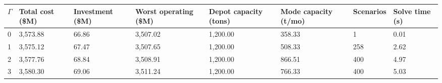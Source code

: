 \begin{tabular}{llllllll}
\toprule
$\Gamma$ & Total cost (\$M) & Investment (\$M) & Worst operating (\$M) & Depot capacity (tons) & Mode capacity (t/mo) & Scenarios & Solve time (s) \\
\midrule
0 & 3,573.88 & 66.86 & 3,507.02 & 1,200.00 & 358.33 & 1 & 0.01 \\
1 & 3,575.12 & 67.47 & 3,507.65 & 1,200.00 & 508.33 & 258 & 2.62 \\
2 & 3,577.76 & 68.84 & 3,508.91 & 1,200.00 & 866.51 & 400 & 4.97 \\
3 & 3,580.30 & 69.06 & 3,511.24 & 1,200.00 & 766.33 & 400 & 5.03 \\
\bottomrule
\end{tabular}
